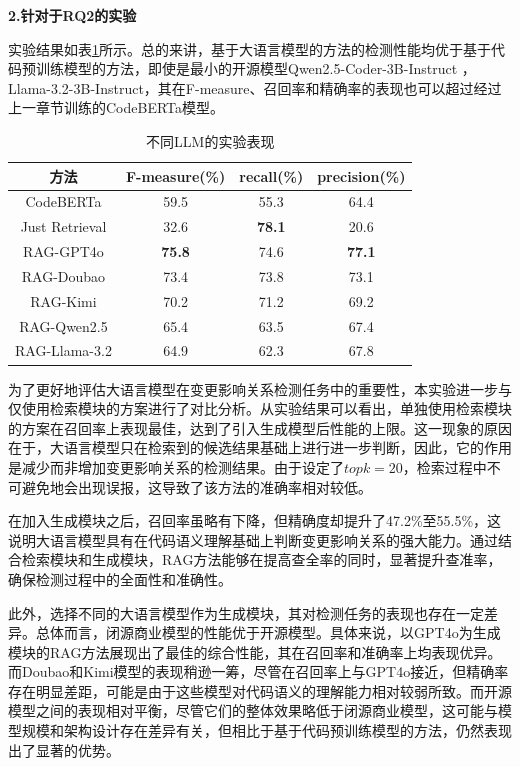 \textbf{2.针对于RQ2的实验}

实验结果如表\ref{2_不同LLM的实验表现}所示。总的来讲，基于大语言模型的方法的检测性能均优于基于代码预训练模型的方法，即使是最小的开源模型Qwen2.5-Coder-3B-Instruct ，Llama-3.2-3B-Instruct，其在F-measure、召回率和精确率的表现也可以超过经过上一章节训练的CodeBERTa模型。

\begin{table}[htbp]
\caption{不同LLM的实验表现}
\label{2_不同LLM的实验表现}
\vspace{0.5em}\centering\wuhao
\begin{tabular}{cccc}
\toprule
方法 & F-measure(\%) & recall(\%) & precision(\%)  \\
\midrule
CodeBERTa & 59.5 & 55.3 & 64.4 \\
Just Retrieval & 32.6 & \textbf{78.1} & 20.6 \\
\midrule
RAG-GPT4o & \textbf{75.8} & 74.6 & \textbf{77.1} \\
RAG-Doubao & 73.4 & 73.8 & 73.1 \\
RAG-Kimi & 70.2 & 71.2 & 69.2 \\
RAG-Qwen2.5 & 65.4 & 63.5 & 67.4 \\
RAG-Llama-3.2 & 64.9 & 62.3 & 67.8 \\
\bottomrule
\end{tabular}
\end{table}

为了更好地评估大语言模型在变更影响关系检测任务中的重要性，本实验进一步与仅使用检索模块的方案进行了对比分析。从实验结果可以看出，单独使用检索模块的方案在召回率上表现最佳，达到了引入生成模型后性能的上限。这一现象的原因在于，大语言模型只在检索到的候选结果基础上进行进一步判断，因此，它的作用是减少而非增加变更影响关系的检测结果。由于设定了$topk=20$，检索过程中不可避免地会出现误报，这导致了该方法的准确率相对较低。

在加入生成模块之后，召回率虽略有下降，但精确度却提升了47.2\%至55.5\%，这说明大语言模型具有在代码语义理解基础上判断变更影响关系的强大能力。通过结合检索模块和生成模块，RAG方法能够在提高查全率的同时，显著提升查准率，确保检测过程中的全面性和准确性。

此外，选择不同的大语言模型作为生成模块，其对检测任务的表现也存在一定差异。总体而言，闭源商业模型的性能优于开源模型。具体来说，以GPT4o为生成模块的RAG方法展现出了最佳的综合性能，其在召回率和准确率上均表现优异。而Doubao和Kimi模型的表现稍逊一筹，尽管在召回率上与GPT4o接近，但精确率存在明显差距，可能是由于这些模型对代码语义的理解能力相对较弱所致。而开源模型之间的表现相对平衡，尽管它们的整体效果略低于闭源商业模型，这可能与模型规模和架构设计存在差异有关，但相比于基于代码预训练模型的方法，仍然表现出了显著的优势。

